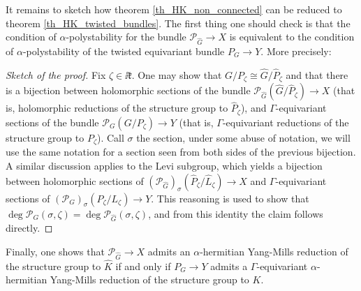 It remains to sketch how theorem \ref{th_HK_non_connected} can be reduced to theorem \ref{th_HK_twisted_bundles}. The first thing one should check is that the condition of \(\alpha\)-polystability for the bundle \(\mathcal{P}_{\hat{G}}\to X\) is equivalent to the condition of \(\alpha\)-polystability of the twisted equivariant bundle \(P_G \to Y\). More precisely:

\begin{proof}[\textit{Sketch of the proof}]
    Fix \(\zeta \in \ii \mathfrak{k}\). One may show that \(G/P_\zeta \cong \hat{G}/\hat{P}_\zeta\) and that there is a bijection between holomorphic sections of the bundle \(\mathcal{P}_{\hat{G}}(\hat{G}/\hat{P}_\zeta)\to X\) (that is, holomorphic reductions of the structure group to \(\hat{P}_\zeta\)), and \(\Gamma\)-equivariant sections of the bundle \(\mathcal{P}_G(G/P_\zeta) \to Y\) (that is, \(\Gamma\)-equivariant reductions of the structure group to \(P_\zeta\)). Call \(\sigma\) the section, under some abuse of notation, we will use the same notation for a section seen from both sides of the previous bijection. A similar discussion applies to the Levi subgroup, which yields a bijection between holomorphic sections of \((\mathcal{P}_{\hat{G}})_\sigma(\hat{P}_\zeta/\hat{L}_\zeta)\to X\) and \(\Gamma\)-equivariant sections of \((\mathcal{P}_G)_\sigma(P_\zeta/L_\zeta)\to Y\). This reasoning is used to show that \(\deg \mathcal{P}_G(\sigma, \zeta)=\deg \mathcal{P}_{\hat{G}}(\sigma, \zeta)\), and from this identity the claim follows directly.
\end{proof}

Finally, one shows that \(\mathcal{P}_{\hat{G}}\to X\) admits an \(\alpha\)-hermitian Yang-Mills reduction of the structure group to \(\hat{K}\) if and only if \(P_G\to Y\) admits a \(\Gamma\)-equivariant \(\alpha\)-hermitian Yang-Mills reduction of the structure group to \(K\).

